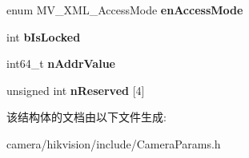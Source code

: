 \begin{DoxyCompactItemize}
\item 
\mbox{\label{struct___m_v___x_m_l___f_e_a_t_u_r_e___register___a7f2258e0191aaba2c61b54529e0eff16}} 
enum M\+V\+\_\+\+X\+M\+L\+\_\+\+Access\+Mode {\bfseries en\+Access\+Mode}
\item 
\mbox{\label{struct___m_v___x_m_l___f_e_a_t_u_r_e___register___a7d6620299acedd97fbabe0f4928ab24f}} 
int {\bfseries b\+Is\+Locked}
\item 
\mbox{\label{struct___m_v___x_m_l___f_e_a_t_u_r_e___register___a5c9a352810ed4a4c85904888dcce33bf}} 
int64\+\_\+t {\bfseries n\+Addr\+Value}
\item 
\mbox{\label{struct___m_v___x_m_l___f_e_a_t_u_r_e___register___a5a7d105554fff98b158b5aaf42d8af91}} 
unsigned int {\bfseries n\+Reserved} \mbox{[}4\mbox{]}
\end{DoxyCompactItemize}


该结构体的文档由以下文件生成\+:\begin{DoxyCompactItemize}
\item 
camera/hikvision/include/Camera\+Params.\+h\end{DoxyCompactItemize}
